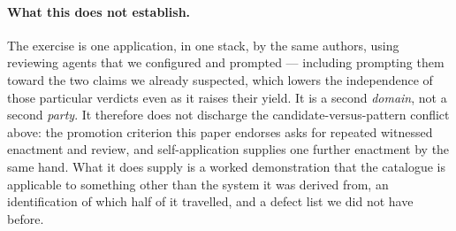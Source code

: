 \paragraph{What this does not establish.}  The exercise is one application, in
one stack, by the same authors, using reviewing agents that we configured and
prompted --- including prompting them toward the two claims we already
suspected, which lowers the independence of those particular verdicts even as it
raises their yield.  It is a second \emph{domain}, not a second \emph{party}.  It
therefore does not discharge the candidate-versus-pattern conflict above: the
promotion criterion this paper endorses asks for repeated witnessed enactment
and review, and self-application supplies one further enactment by the same
hand.  What it does supply is a worked demonstration that the catalogue is
applicable to something other than the system it was derived from, an
identification of which half of it travelled, and a defect list we did not have
before.
